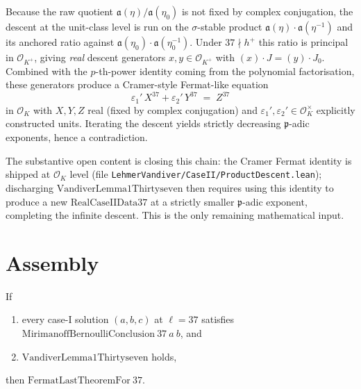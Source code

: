 Because the raw quotient $\mathfrak a(\eta)/\mathfrak a(\eta_0)$ is not
fixed by complex conjugation, the descent at the unit-class level is run
on the $\sigma$-stable product $\mathfrak a(\eta) \cdot
\mathfrak a(\eta^{-1})$ and its anchored ratio against
$\mathfrak a(\eta_0) \cdot \mathfrak a(\eta_0^{-1})$.  Under
$37 \nmid h^+$ this ratio is principal in $\mathcal O_{K^+}$, giving
\emph{real} descent generators $x, y \in \mathcal O_{K^+}$ with
$(x) \cdot J = (y) \cdot J_0$.  Combined with the $p$-th-power
identity coming from the polynomial factorisation, these generators
produce a Cramer-style Fermat-like equation
\[
  \varepsilon_1' \, X^{37} + \varepsilon_2' \, Y^{37} \;=\; Z^{37}
\]
in $\mathcal O_K$ with $X, Y, Z$ real (fixed by complex conjugation) and
$\varepsilon_1', \varepsilon_2' \in \mathcal O_K^\times$ explicitly
constructed units.  Iterating the descent yields strictly decreasing
$\mathfrak p$-adic exponents, hence a contradiction.

The substantive open content is closing this chain: the Cramer Fermat
identity is shipped at $\mathcal O_K$ level (file
\texttt{LehmerVandiver/CaseII/ProductDescent.lean}); discharging
$\mathrm{VandiverLemma1Thirtyseven}$ then requires using this identity
to produce a new $\mathrm{RealCaseIIData37}$ at a strictly smaller
$\mathfrak p$-adic exponent, completing the infinite descent.  This is
the only remaining mathematical input.

\section{Assembly}

\begin{theorem}
  \label{thm:fermatLastTheoremFor_thirtyseven_of_conclusion_and_vandiverLemma1}
  \leanok
  If
  \begin{enumerate}
    \item every case-I solution $(a,b,c)$ at $\ell = 37$ satisfies
      $\mathrm{MirimanoffBernoulliConclusion}\ 37\ a\ b$, and
    \item $\mathrm{VandiverLemma1Thirtyseven}$ holds,
  \end{enumerate}
  then $\mathrm{FermatLastTheoremFor}\ 37$.
\end{theorem}


